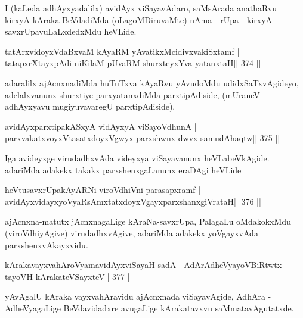 \begin{artha}
I (kaLeda adhAyxyadalilx) avidAyx viSayavAdaro, saMsArada anathaRvu 
kirxyA-kAraka BeVdadiMda (oLagoMDiruvaMte) nAma - rUpa - kirxyA savxrUpavuLaLxdedxMdu heVLide. 
\end{artha}


\begin{shl}
tatArxvidoyxVdaBxvaM kAyaRM yAvatikxMcidivxvakiSxtamf |
tatapxrXtayxpAdi niKilaM pUvaRM shurxteyxYva yatanxtaH\hfill || 374 ||
\end{shl}

\begin{artha}
adaralilx ajAcnxnadiMda huTuTxva kAyaRvu yAvudoMdu udidxSaTxvAgideyo, 
adelalxvanunx shurxtiye parxyatanxdiMda parxtipAdiside, (mUraneV 
adhAyxyavu mugiyuvavaregU parxtipAdiside).
\end{artha}

\begin{shl}
avidAyxparxtipakASxyA vidAyxyA viSayoV\s dhunA |
parxvakatxvoyxV\s tasatxdoyxVgwyx parxshwnx dwvx samudAhaqtw\hfill || 375 ||
\end{shl}

\begin{artha}
Iga avideyxge virudadhxvAda videyxya viSayavanunx heVLabeVkAgide. adariMda adakekx takakx parxshenxgaLanunx eraDAgi heVLide
\end{artha}

\begin{shl}
heVtusavxrUpakAyARNi viroVdhiVni parasapxramf |
avidAyxvidayxyoVyaRsAmxtatxdoyxVgayxparxshanxgiVrataH\hfill || 376 ||
\end{shl}

\begin{artha}
ajAcnxna-matutx jAcnxnagaLige kAraNa-savxrUpa, PalagaLu oMdakokxMdu  (viroVdhiyAgive) virudadhxvAgive, adariMda adakekx yoVgayxvAda parxshenxvAkayxvidu.
\end{artha}

\begin{shl}
kArakavayxvahAroV\s yamavidAyxviSayaH sadA |
AdArAdheVyayoVBiRtwtx tayoVH kArakateVSayxteV\hfill || 377 ||
\end{shl}

\begin{artha}
yAvAgalU kAraka vayxvahAravidu ajAcnxnada viSayavAgide, AdhAra -  AdheVyagaLige BeVdavidadxre avugaLige kArakatavxvu saMmatavAgutatxde.
\end{artha}

